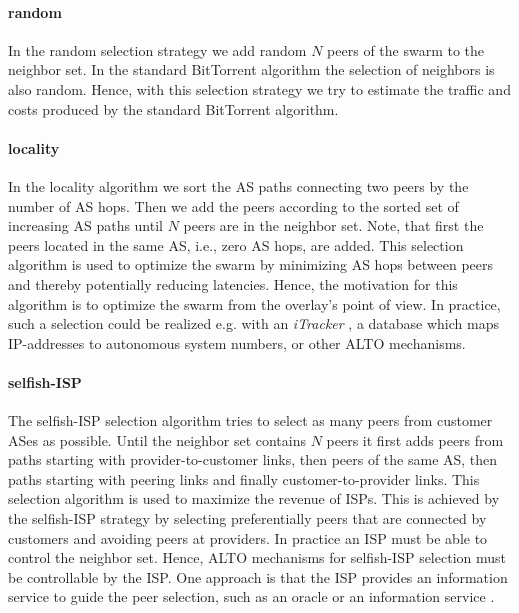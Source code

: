 \paragraph{random}
In the random selection strategy we add random $N$ peers of the swarm to the neighbor set. In the standard BitTorrent algorithm the selection of neighbors is also random. Hence, with this selection strategy we try to estimate the traffic and costs produced by the standard BitTorrent algorithm.
\paragraph{locality}
In the locality algorithm we sort the AS paths connecting two peers by the number of AS hops. Then we add the peers according to the sorted set of increasing AS paths until $N$ peers are in the neighbor set. Note, that first the peers located in the same AS, i.e., zero AS hops, are added. This selection algorithm is used to optimize the swarm by minimizing AS hops between peers and thereby potentially reducing latencies. Hence, the motivation for this algorithm is to optimize the swarm from the overlay's point of view.
In practice, such a selection could be realized e.g. with an \emph{iTracker} \cite{Xie2008}, a database which maps IP-addresses to autonomous system numbers, or other ALTO mechanisms.
\paragraph{selfish-ISP}
The selfish-ISP selection algorithm tries to select as many peers from customer ASes as possible. Until the neighbor set contains $N$ peers it first adds peers from paths starting with provider-to-customer links, then peers of the same AS, then paths starting with peering links and finally customer-to-provider links.
This selection algorithm is used to maximize the revenue of ISPs. This is achieved by the selfish-ISP strategy by selecting preferentially peers that are connected by customers and avoiding peers at providers. In practice an ISP must be able to control the neighbor set. Hence, ALTO mechanisms for selfish-ISP selection must be controllable by the ISP. One approach is that the ISP provides an information service to guide the peer selection, such as an oracle \cite{Aggarwal2007} or an information service \cite{hossfia}.

